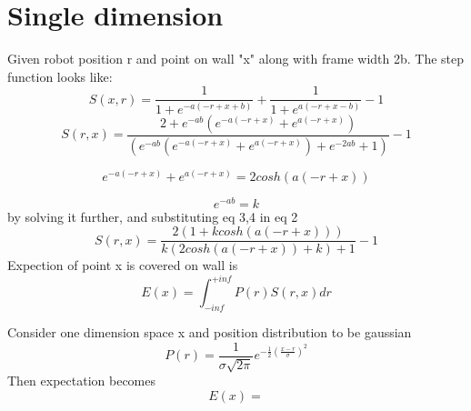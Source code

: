 \documentclass[11pt,twoside,a4paper]{article}
\begin{document}
\section{Single dimension}
Given robot position r and point on wall "x" along with frame width 2b. The step function looks like:
\begin{equation}
S(x,r)=\frac{1}{1+e^{-a(-r+x+b)}}+\frac{1}{1+e^{a(-r+x-b)}}-1
\end{equation}
\begin{equation}
S(r,x)=\frac{2+e^{-ab}(e^{-a(-r+x)}+e^{a(-r+x)})}{(e^{-ab}(e^{-a(-r+x)}+e^{a(-r+x)})+e^{-2ab}+1)}-1
\end{equation}

\begin{equation}
e^{-a(-r+x)}+e^{a(-r+x)}=2cosh(a(-r+x))
\end{equation}

\begin{equation}
e^{-ab}=k
\end{equation}
by solving it further, and substituting eq 3,4 in eq 2
\begin{equation}
S(r,x)=\frac{2(1+kcosh(a(-r+x)))}{k(2cosh(a(-r+x))+k)+1}-1
\end{equation}
Expection of point x is covered on wall is
\begin{equation}
E(x)=\int_{-inf}^{+inf} P(r) S(r,x) dr 
\end{equation}


Consider one dimension space x and position distribution to be gaussian
\begin{equation}
P(r)=\frac{1}{\sigma \sqrt{2\pi}}e^{-\frac{1}{2}(\frac{x-r}{\sigma})^2}
\end{equation}
Then expectation becomes
\begin{equation}
E(x)=
\end{equation}
\end{document}
